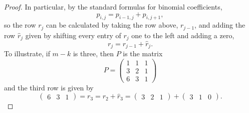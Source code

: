 \begin{proof}
  In particular, by the standard formulas for binomial coefficients,
  \[ p_{i,j} = p_{i-1,j} + p_{i,j+1}, \]
  so the row $r_{j}$ can be calculated by taking the row
  above,
  $r_{j-1}$, and adding the row $\widehat{r}_j$ given by shifting
  every entry of $r_j$ one to the left and adding a zero,
  \[ r_j = r_{j-1} + \widehat{r}_j. \]
  To illustrate, if $m-k$ is three, then $P$ is the matrix
  \[ P = 
  \begin{pmatrix}
    1 &1 & 1 \\
    3 &2 & 1 \\
    6 & 3 & 1
  \end{pmatrix} \]
  and the third row is given by
  \[
  \begin{pmatrix}
    6 &3 & 1
  \end{pmatrix} = r_3 = r_2 + \widehat{r}_3 =
  \begin{pmatrix}
    3 & 2 & 1
  \end{pmatrix} +
  \begin{pmatrix}
    3 & 1 & 0
  \end{pmatrix}. \]
  

\end{proof}
